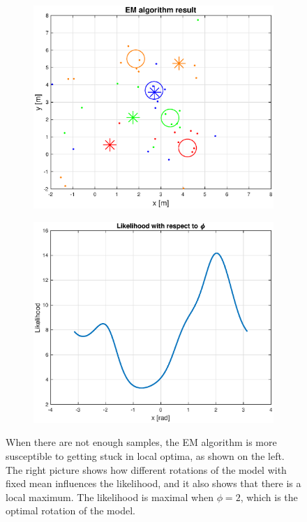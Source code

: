 \begin{figure}[H]
	\centering
	\begin{subfigure}{0.49\textwidth}
		\centering
		\includegraphics[scale=0.43]{fig/em_local.eps}
	\end{subfigure}
	\begin{subfigure}{.49\textwidth}
		\centering
		\includegraphics[scale=0.43]{fig/em_local_chart.eps}
		
	\end{subfigure}
	
	\caption[EM local optima]{When there are not enough samples, the EM algorithm is more susceptible to getting stuck in local optima, as shown on the left. The right picture shows how different rotations of the model with fixed mean influences the likelihood, and it also shows that there is a local maximum.  The likelihood is maximal when $\phi = 2$, which is the optimal rotation of the model.}
	\label{fig:em_local}
\end{figure}

